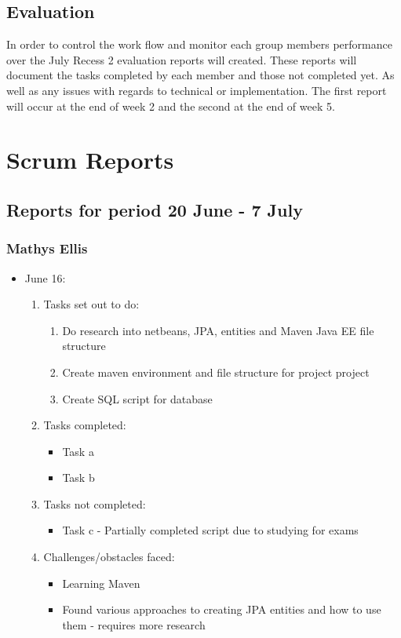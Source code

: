 \documentclass[12pt]{article}
\begin{document}
\subsection{Evaluation}
In order to control the work flow and monitor each group members performance over the July Recess 2 evaluation reports will created. These reports will document the tasks completed by each member and those not completed yet. As well as any issues with regards to technical or implementation. The first report will occur at the end of week 2 and the second at the end of week 5.  

\newpage
\section{Scrum Reports}
\subsection{Reports for period 20 June - 7 July}
\subsubsection{Mathys Ellis}
	\begin{itemize}
		\item June 16:
		\begin{enumerate}
			\item Tasks set out to do:
			\begin{enumerate}
				\item Do research into netbeans, JPA, entities and Maven Java EE file structure
				\item Create maven environment and file structure for project project
				\item Create SQL script for database
			\end{enumerate}
			\item Tasks completed:
			\begin{itemize}
				\item Task a
				\item Task b
			\end{itemize}
			\item Tasks not completed:
			\begin{itemize}
				\item Task c - Partially completed script due to studying for exams
			\end{itemize}
			\item Challenges/obstacles faced:
			\begin{itemize}
				\item Learning Maven
				\item Found various approaches to creating JPA entities and how to use them - requires more research
			\end{itemize}			
		\end{enumerate}
	\end{itemize}
	
\end{document}

